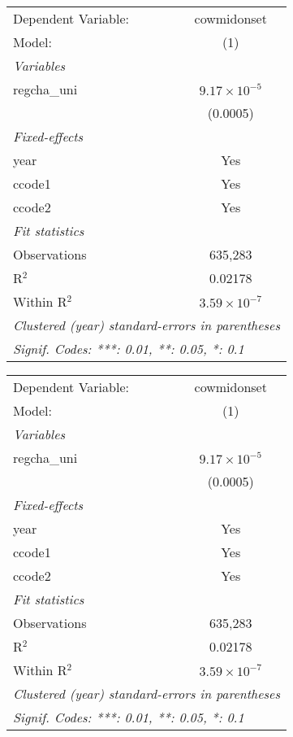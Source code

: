 \begingroup
\centering
\begin{tabular}{lc}
   \tabularnewline \midrule \midrule
   Dependent Variable: & cowmidonset\\  
   Model:              & (1)\\  
   \midrule
   \emph{Variables}\\
   regcha\_uni         & $9.17\times 10^{-5}$\\    
                       & (0.0005)\\   
   \midrule
   \emph{Fixed-effects}\\
   year                & Yes\\  
   ccode1              & Yes\\  
   ccode2              & Yes\\  
   \midrule
   \emph{Fit statistics}\\
   Observations        & 635,283\\  
   R$^2$               & 0.02178\\  
   Within R$^2$        & $3.59\times 10^{-7}$\\   
   \midrule \midrule
   \multicolumn{2}{l}{\emph{Clustered (year) standard-errors in parentheses}}\\
   \multicolumn{2}{l}{\emph{Signif. Codes: ***: 0.01, **: 0.05, *: 0.1}}\\
\end{tabular}
\par\endgroup



\begingroup
\centering
\begin{tabular}{lc}
   \tabularnewline \midrule \midrule
   Dependent Variable: & cowmidonset\\  
   Model:              & (1)\\  
   \midrule
   \emph{Variables}\\
   regcha\_uni         & $9.17\times 10^{-5}$\\    
                       & (0.0005)\\   
   \midrule
   \emph{Fixed-effects}\\
   year                & Yes\\  
   ccode1              & Yes\\  
   ccode2              & Yes\\  
   \midrule
   \emph{Fit statistics}\\
   Observations        & 635,283\\  
   R$^2$               & 0.02178\\  
   Within R$^2$        & $3.59\times 10^{-7}$\\   
   \midrule \midrule
   \multicolumn{2}{l}{\emph{Clustered (year) standard-errors in parentheses}}\\
   \multicolumn{2}{l}{\emph{Signif. Codes: ***: 0.01, **: 0.05, *: 0.1}}\\
\end{tabular}
\par\endgroup



